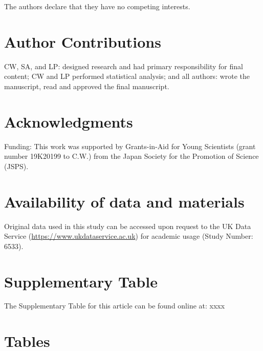 \documentclass[utf8]{frontiersSCNS}
\begin{document}
The authors declare that they have no competing interests.

\hypertarget{author-contributions}{%
\section*{Author Contributions}\label{author-contributions}}

CW, SA, and LP: designed research and had primary responsibility for
final content; CW and LP performed statistical analysis; and all
authors: wrote the manuscript, read and approved the final manuscript.

\hypertarget{acknowledgments}{%
\section*{Acknowledgments}\label{acknowledgments}}

Funding: This work was supported by Grants-in-Aid for Young Scientists
(grant number 19K20199 to C.W.) from the Japan Society for the Promotion
of Science (JSPS).

\hypertarget{availability-of-data-and-materials}{%
\section*{Availability of data and
materials}\label{availability-of-data-and-materials}}

Original data used in this study can be accessed upon request to the UK
Data Service (\url{https://www.ukdataservice.ac.uk}) for academic usage
(Study Number: 6533).

\hypertarget{supplementary-table}{%
\section*{Supplementary Table}\label{supplementary-table}}

The Supplementary Table for this article can be found online at: xxxx

\newpage

\hypertarget{tables}{%
\section*{Tables}\label{tables}}
\end{document}
